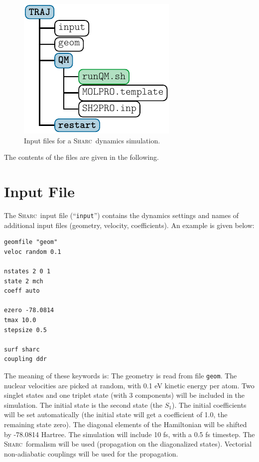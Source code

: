 \documentclass[a4paper,11pt,DIV=15,openany]{scrbook}
\newcommand{\sharc}{\textsc{Sharc}}
\newcommand{\ttt}[1]{\texttt{#1}}
\newenvironment{example}{
  \vspace{0mm}
  \definecolor{shadecolor}{HTML}{E4F4FF}
  \begin{shaded}
}{
  \end{shaded}
}
\begin{document}
\begin{figure}
  \centering
  \includegraphics[]{img/dir_traj/dir_traj.pdf}
  \caption{Input files for a \sharc\ dynamics simulation.}
  \label{fig:traj_dir}
\end{figure}

The contents of the files are given in the following.

\section{Input File}

The \sharc\ input file (``\ttt{input}'') contains the dynamics settings and names of additional input files (geometry, velocity, coefficients). An example is given below:
\begin{example}\vspace{-8mm}
\begin{verbatim}
geomfile "geom"
veloc random 0.1

nstates 2 0 1 
state 2 mch
coeff auto

ezero -78.0814
tmax 10.0
stepsize 0.5

surf sharc
coupling ddr
\end{verbatim}\vspace{-5mm}
\end{example}

The meaning of these keywords is: The geometry is read from file \ttt{geom}. The nuclear velocities are picked at random, with 0.1 eV kinetic energy per atom. Two singlet states and one triplet state (with 3 components) will be included in the simulation. The initial state is the second state (the $S_1$). The initial coefficients will be set automatically (the initial state will get a coefficient of 1.0, the remaining state zero). The diagonal elements of the Hamiltonian will be shifted by -78.0814 Hartree. The simulation will include 10 fs, with a 0.5 fs timestep. The \sharc\ formalism will be used (propagation on the diagonalized states). Vectorial non-adiabatic couplings will be used for the propagation. 
\end{document}
